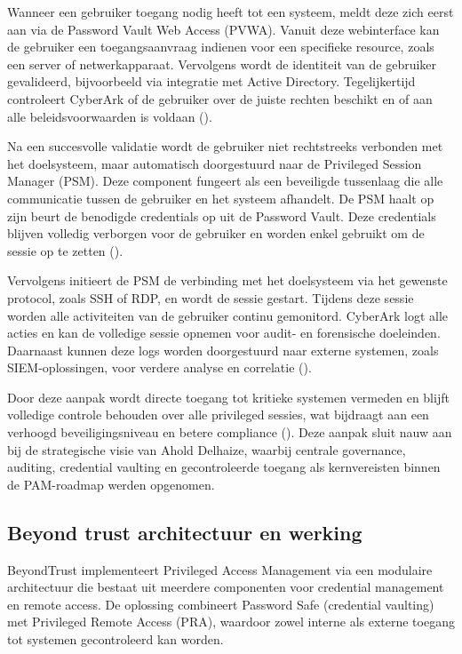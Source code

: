 Wanneer een gebruiker toegang nodig heeft tot een systeem, meldt deze zich eerst aan via de Password Vault Web Access (PVWA). Vanuit deze webinterface kan de gebruiker een toegangsaanvraag indienen voor een specifieke resource, zoals een server of netwerkapparaat. Vervolgens wordt de identiteit van de gebruiker gevalideerd, bijvoorbeeld via integratie met Active Directory. Tegelijkertijd controleert CyberArk of de gebruiker over de juiste rechten beschikt en of aan alle beleidsvoorwaarden is voldaan (\cite{cyberark_pam_architecture}).

Na een succesvolle validatie wordt de gebruiker niet rechtstreeks verbonden met het doelsysteem, maar automatisch doorgestuurd naar de Privileged Session Manager (PSM). Deze component fungeert als een beveiligde tussenlaag die alle communicatie tussen de gebruiker en het systeem afhandelt. De PSM haalt op zijn beurt de benodigde credentials op uit de Password Vault. Deze credentials blijven volledig verborgen voor de gebruiker en worden enkel gebruikt om de sessie op te zetten (\cite{cyberark_psm}).

Vervolgens initieert de PSM de verbinding met het doelsysteem via het gewenste protocol, zoals SSH of RDP, en wordt de sessie gestart. Tijdens deze sessie worden alle activiteiten van de gebruiker continu gemonitord. CyberArk logt alle acties en kan de volledige sessie opnemen voor audit- en forensische doeleinden. Daarnaast kunnen deze logs worden doorgestuurd naar externe systemen, zoals SIEM-oplossingen, voor verdere analyse en correlatie (\cite{cyberark_psm,cyberark_pam_architecture}).

Door deze aanpak wordt directe toegang tot kritieke systemen vermeden en blijft volledige controle behouden over alle privileged sessies, wat bijdraagt aan een verhoogd beveiligingsniveau en betere compliance (\cite{nist2020}). Deze aanpak sluit nauw aan bij de strategische visie van Ahold Delhaize, waarbij centrale governance, auditing, credential vaulting en gecontroleerde toegang als kernvereisten binnen de PAM-roadmap werden opgenomen.

\subsection{Beyond trust architectuur en werking }
BeyondTrust implementeert Privileged Access Management via een modulaire architectuur die bestaat uit meerdere componenten voor credential management en remote access. De oplossing combineert Password Safe (credential vaulting) met Privileged Remote Access (PRA), waardoor zowel interne als externe toegang tot systemen gecontroleerd kan worden.

